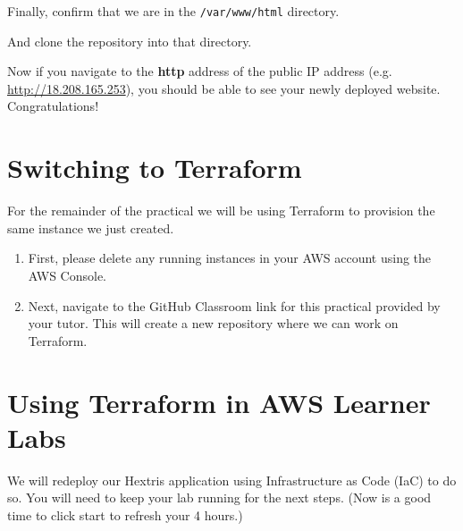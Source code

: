 \documentclass{csse4400}
\begin{document}

Finally, confirm that we are in the \texttt{/var/www/html} directory.



And clone the repository into that directory.



Now if you navigate to the \textbf{http} address of the public IP address (e.g. \url{http://18.208.165.253}), you should be able to see your newly deployed website.
Congratulations!



\section{Switching to Terraform}

For the remainder of the practical we will be using Terraform to provision the same instance we just created.

\begin{enumerate}
    \item First, please delete any running instances in your AWS account using the AWS Console.
    \item Next, navigate to the GitHub Classroom link for this practical provided by your tutor.
    This will create a new repository where we can work on Terraform.
\end{enumerate}

\section{Using Terraform in AWS Learner Labs}
We will redeploy our Hextris application using Infrastructure as Code (IaC) to do so.
You will need to keep your lab running for the next steps.
(Now is a good time to click start to refresh your 4 hours.)
\end{document}
